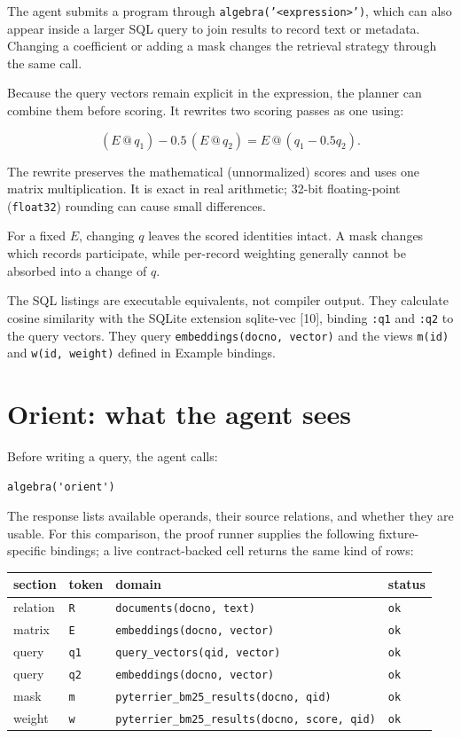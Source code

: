 \documentclass{article}
\makeatletter
\newcommand{\matmul}{\mathbin{@}}
\makeatother
\begin{document}
The agent submits a program through \texttt{algebra('<expression>')}, which can also appear inside a larger SQL query to join results to record text or metadata. Changing a coefficient or adding a mask changes the retrieval strategy through the same call.

Because the query vectors remain explicit in the expression, the planner can combine them before scoring. It rewrites two scoring passes as one using:

\[
  (E\matmul q_1)-0.5\,(E\matmul q_2)
  = E\matmul(q_1-0.5q_2).
\]

The rewrite preserves the mathematical (unnormalized) scores and uses one matrix multiplication. It is exact in real arithmetic; 32-bit floating-point (\texttt{float32}) rounding can cause small differences.

For a fixed \(E\), changing \(q\) leaves the scored identities intact. A mask changes which records participate, while per-record weighting generally cannot be absorbed into a change of \(q\).

The SQL listings are executable equivalents, not compiler output. They calculate cosine similarity with the SQLite extension sqlite-vec {[}10{]}, binding \texttt{:q1} and \texttt{:q2} to the query vectors. They query \texttt{embeddings(docno, vector)} and the views \texttt{m(id)} and \texttt{w(id, weight)} defined in Example bindings.

\hypertarget{orient-what-the-agent-sees}{%
\section{Orient: what the agent sees}\label{orient-what-the-agent-sees}}

Before writing a query, the agent calls:

\begin{lstlisting}
algebra('orient')
\end{lstlisting}

The response lists available operands, their source relations, and whether they are usable. For this comparison, the proof runner supplies the following fixture-specific bindings; a live contract-backed cell returns the same kind of rows:

\begin{longtable}[]{@{}llll@{}}
\toprule\noalign{}
section & token & domain & status \\
\midrule\noalign{}
\endhead
\bottomrule\noalign{}
\endlastfoot
relation & \texttt{R} & \texttt{documents(docno,\ text)} & \texttt{ok} \\
matrix & \texttt{E} & \texttt{embeddings(docno,\ vector)} & \texttt{ok} \\
query & \texttt{q1} & \texttt{query\_vectors(qid,\ vector)} & \texttt{ok} \\
query & \texttt{q2} & \texttt{embeddings(docno,\ vector)} & \texttt{ok} \\
mask & \texttt{m} & \texttt{pyterrier\_bm25\_results(docno,\ qid)} & \texttt{ok} \\
weight & \texttt{w} & \texttt{pyterrier\_bm25\_results(docno,\ score,\ qid)} & \texttt{ok} \\
\end{longtable}
\end{document}
